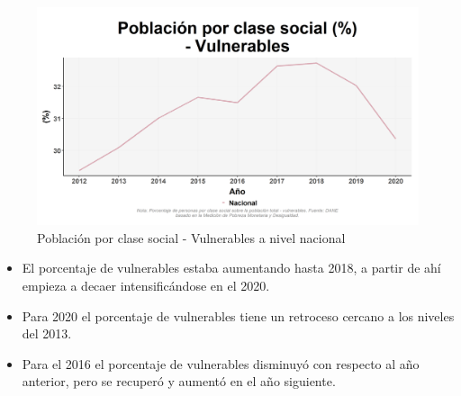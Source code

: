     \begin{figure}[H]
        \caption{Población por clase social - Vulnerables a nivel nacional \label{map_result_2} }
        \begin{center}
        \includegraphics[width=\textwidth,keepaspectratio]{img/var_245_trend.png}
        \end{center}
    \end{figure}
            \begin{itemize}
                    \item El porcentaje de vulnerables estaba aumentando hasta 2018, a partir de ahí empieza a decaer intensificándose en el 2020.
                    \item Para 2020 el porcentaje de vulnerables tiene un retroceso cercano a los niveles del 2013.
                    \item Para el 2016 el porcentaje de vulnerables disminuyó con respecto al año anterior, pero se recuperó y aumentó en el año siguiente.
                    \end{itemize}

